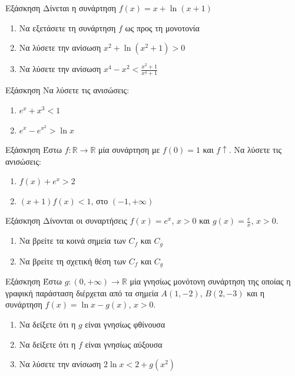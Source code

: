 \documentclass[greek]{beamer}
\begin{document}
\begin{frame}{Εξάσκηση}
 Δίνεται η συνάρτηση $f(x)=x+\ln (x+1)$
 \begin{enumerate}
  \item Να εξετάσετε τη συνάρτηση $f$ ως προς τη μονοτονία \pause
  \item Να λύσετε την ανίσωση $x^2+\ln (x^2+1)>0$ \pause
  \item Να λύσετε την ανίσωση $x^4-x^2<\frac{x^2+1}{x^4+1}$
 \end{enumerate}
\end{frame}

\begin{frame}{Εξάσκηση}
 Να λύσετε τις ανισώσεις:
 \begin{enumerate}
  \item $e^x+x^3<1$ \pause
  \item $e^x-e^{x^2}>\ln x$
 \end{enumerate}
\end{frame}

\begin{frame}{Εξάσκηση}
 Έστω $f:\mathbb{R}\to\mathbb{R}$ μία συνάρτηση με $f(0)=1$ και $f\uparrow$. Να λύσετε τις ανισώσεις:
 \begin{enumerate}
  \item $f(x)+e^x>2$ \pause
  \item $(x+1)f(x)<1$, στο $(-1,+\infty)$
 \end{enumerate}
\end{frame}

\begin{frame}{Εξάσκηση}
 Δίνονται οι συναρτήσεις $f(x)=e^x$, $x>0$ και $g(x)=\frac{e}{x}$, $x>0$.
 \begin{enumerate}
  \item Να βρείτε τα κοινά σημεία των $C_f$ και $C_g$ \pause
  \item Να βρείτε τη σχετική θέση των $C_f$ και $C_g$
 \end{enumerate}
\end{frame}

\begin{frame}{Εξάσκηση}
 Έστω $g:(0,+\infty)\to\mathbb{R}$ μία γνησίως μονότονη συνάρτηση της οποίας η γραφική παράσταση διέρχεται από τα σημεία $Α(1,-2)$, $Β(2,-3)$ και η συνάρτηση $f(x)=\ln x-g(x)$, $x>0$.
 \begin{enumerate}
  \item Να δείξετε ότι η $g$ είναι γνησίως φθίνουσα \pause
  \item Να δείξετε ότι η $f$ είναι γνησίως αύξουσα \pause
  \item Να λύσετε την ανίσωση $2\ln x<2+g(x^2)$
 \end{enumerate}
\end{frame}
\end{document}
